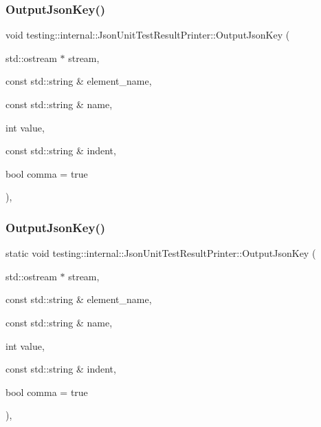 \mbox{\label{classtesting_1_1internal_1_1_json_unit_test_result_printer_a312b071e5ed3913b854490b1e427d326}} 
\subsubsection{\texorpdfstring{OutputJsonKey()}{OutputJsonKey()}\hspace{0.1cm}{\footnotesize\ttfamily [5/6]}}
{\footnotesize\ttfamily void testing\+::internal\+::\+Json\+Unit\+Test\+Result\+Printer\+::\+Output\+Json\+Key (\begin{DoxyParamCaption}\item[{std\+::ostream $\ast$}]{stream,  }\item[{const std\+::string \&}]{element\+\_\+name,  }\item[{const std\+::string \&}]{name,  }\item[{int}]{value,  }\item[{const std\+::string \&}]{indent,  }\item[{bool}]{comma = {\ttfamily true} }\end{DoxyParamCaption})\hspace{0.3cm}{\ttfamily [static]}, {\ttfamily [private]}}

\mbox{\label{classtesting_1_1internal_1_1_json_unit_test_result_printer_af7bacb58770f91639ac729c9b26e3f18}} 
\subsubsection{\texorpdfstring{OutputJsonKey()}{OutputJsonKey()}\hspace{0.1cm}{\footnotesize\ttfamily [6/6]}}
{\footnotesize\ttfamily static void testing\+::internal\+::\+Json\+Unit\+Test\+Result\+Printer\+::\+Output\+Json\+Key (\begin{DoxyParamCaption}\item[{std\+::ostream $\ast$}]{stream,  }\item[{const std\+::string \&}]{element\+\_\+name,  }\item[{const std\+::string \&}]{name,  }\item[{int}]{value,  }\item[{const std\+::string \&}]{indent,  }\item[{bool}]{comma = {\ttfamily true} }\end{DoxyParamCaption})\hspace{0.3cm}{\ttfamily [static]}, {\ttfamily [private]}}

